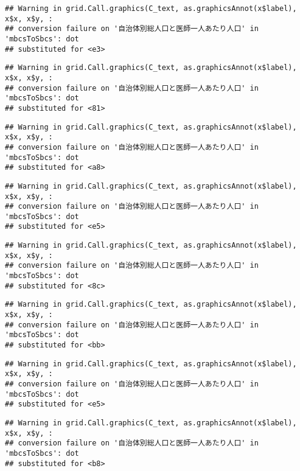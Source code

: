 \documentclass[
]{article}
\begin{document}
\begin{verbatim}
## Warning in grid.Call.graphics(C_text, as.graphicsAnnot(x$label), x$x, x$y, :
## conversion failure on '自治体別総人口と医師一人あたり人口' in 'mbcsToSbcs': dot
## substituted for <e3>
\end{verbatim}

\begin{verbatim}
## Warning in grid.Call.graphics(C_text, as.graphicsAnnot(x$label), x$x, x$y, :
## conversion failure on '自治体別総人口と医師一人あたり人口' in 'mbcsToSbcs': dot
## substituted for <81>
\end{verbatim}

\begin{verbatim}
## Warning in grid.Call.graphics(C_text, as.graphicsAnnot(x$label), x$x, x$y, :
## conversion failure on '自治体別総人口と医師一人あたり人口' in 'mbcsToSbcs': dot
## substituted for <a8>
\end{verbatim}

\begin{verbatim}
## Warning in grid.Call.graphics(C_text, as.graphicsAnnot(x$label), x$x, x$y, :
## conversion failure on '自治体別総人口と医師一人あたり人口' in 'mbcsToSbcs': dot
## substituted for <e5>
\end{verbatim}

\begin{verbatim}
## Warning in grid.Call.graphics(C_text, as.graphicsAnnot(x$label), x$x, x$y, :
## conversion failure on '自治体別総人口と医師一人あたり人口' in 'mbcsToSbcs': dot
## substituted for <8c>
\end{verbatim}

\begin{verbatim}
## Warning in grid.Call.graphics(C_text, as.graphicsAnnot(x$label), x$x, x$y, :
## conversion failure on '自治体別総人口と医師一人あたり人口' in 'mbcsToSbcs': dot
## substituted for <bb>
\end{verbatim}

\begin{verbatim}
## Warning in grid.Call.graphics(C_text, as.graphicsAnnot(x$label), x$x, x$y, :
## conversion failure on '自治体別総人口と医師一人あたり人口' in 'mbcsToSbcs': dot
## substituted for <e5>
\end{verbatim}

\begin{verbatim}
## Warning in grid.Call.graphics(C_text, as.graphicsAnnot(x$label), x$x, x$y, :
## conversion failure on '自治体別総人口と医師一人あたり人口' in 'mbcsToSbcs': dot
## substituted for <b8>
\end{verbatim}
\end{document}
